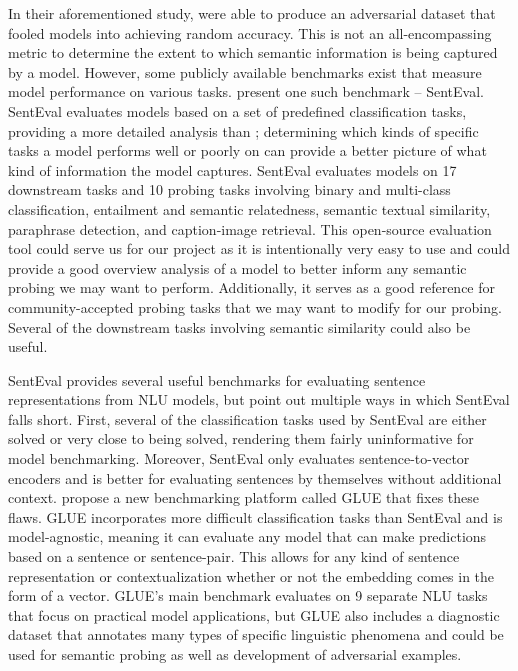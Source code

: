 \documentclass[11pt,a4paper]{article}
\begin{document}
In their aforementioned study, \cite{niven2019probing} were able to produce an adversarial dataset that fooled models into achieving random accuracy. This is not an all-encompassing metric to determine the extent to which semantic information is being captured by a model. However, some publicly available benchmarks exist that measure model performance on various tasks. \cite{conneau2018senteval} present one such benchmark – SentEval. SentEval evaluates models based on a set of predefined classification tasks, providing a more detailed analysis than \cite{niven2019probing}; determining which kinds of specific tasks a model performs well or poorly on can provide a better picture of what kind of information the model captures. SentEval evaluates models on 17 downstream tasks and 10 probing tasks involving binary and multi-class classification, entailment and semantic relatedness, semantic textual similarity, paraphrase detection, and caption-image retrieval. This open-source evaluation tool could serve us for our project as it is intentionally very easy to use and could provide a good overview analysis of a model to better inform any semantic probing we may want to perform. Additionally, it serves as a good reference for community-accepted probing tasks that we may want to modify for our probing. Several of the downstream tasks involving semantic similarity could also be useful. 

SentEval provides several useful benchmarks for evaluating sentence representations from NLU models, but \cite{wang2019glue} point out multiple ways in which SentEval falls short. First, several of the classification tasks used by SentEval are either solved or very close to being solved, rendering them fairly uninformative for model benchmarking. Moreover, SentEval only evaluates sentence-to-vector encoders and is better for evaluating sentences by themselves without additional context. \cite{wang2019glue} propose a new benchmarking platform called GLUE that fixes these flaws. GLUE incorporates more difficult classification tasks than SentEval and is model-agnostic, meaning it can evaluate any model that can make predictions based on a sentence or sentence-pair. This allows for any kind of sentence representation or contextualization whether or not the embedding comes in the form of a vector. GLUE’s main benchmark evaluates on 9 separate NLU tasks that focus on practical model applications, but GLUE also includes a diagnostic dataset that annotates many types of specific linguistic phenomena and could be used for semantic probing as well as development of adversarial examples. 
\end{document}

